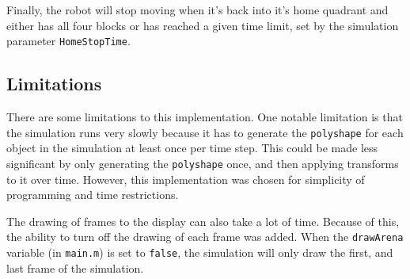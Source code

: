 \documentclass[12pt]{article}
\begin{document}
Finally, the robot will stop moving when it's back into it's home quadrant and either has all four blocks or has reached a given time limit, set by the simulation parameter \texttt{HomeStopTime}.

\subsection{Limitations}
There are some limitations to this implementation. One notable limitation is that the simulation runs very slowly because it has to generate the \texttt{polyshape} for each object in the simulation at least once per time step. This could be made less significant by only generating the \texttt{polyshape} once, and then applying transforms to it over time. However, this implementation was chosen for simplicity of programming and time restrictions.

The drawing of frames to the display can also take a lot of time. Because of this, the ability to turn off the drawing of each frame was added. When the \texttt{drawArena} variable (in \texttt{main.m}) is set to \texttt{false}, the simulation will only draw the first, and last frame of the simulation.
\end{document}

